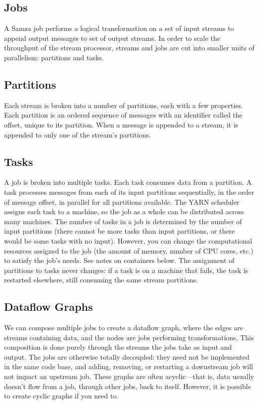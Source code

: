 \documentclass[9pt,twocolumn,twoside]{../../styles/osajnl}
\begin{document}
\subsection{Jobs}
A Samza job performs a logical transformation on a set of input streams to
append output messages to set of output streams. In order to scale the
throughput of the stream processor, streams and jobs are cut into smaller units
of parallelism: partitions and tasks.\cite{www-samza}

\subsection{Partitions}
Each stream is broken into a number of partitions, each with a few properties.
Each partition is an ordered sequence of messages with an identifier called the
offset, unique to its partition. When a message is appended to a stream, it is
appended to only one of the stream’s partitions.\cite{www-samza}

\subsection{Tasks}
A job is broken into multiple tasks. Each task consumes data from a partition. A
task processes messages from each of its input partitions sequentially, in the
order of message offset, in parallel for all partitions available. The YARN
scheduler assigns each task to a machine, so the job as a whole can be
distributed across many machines. The number of tasks in a job is determined by
the number of input partitions (there cannot be more tasks than input
partitions, or there would be some tasks with no input). However, you can change
the computational resources assigned to the job (the amount of memory, number of
CPU cores, etc.) to satisfy the job’s needs. See notes on containers below. The
assignment of partitions to tasks never changes: if a task is on a machine that
fails, the task is restarted elsewhere, still consuming the same stream
partitions.\cite{www-samza}\cite{paper5}

\subsection{Dataflow Graphs}
We can compose multiple jobs to create a dataflow graph, where the edges are
streams containing data, and the nodes are jobs performing transformations. This
composition is done purely through the streams the jobs take as input and
output. The jobs are otherwise totally decoupled: they need not be implemented
in the same code base, and adding, removing, or restarting a downstream job will
not impact an upstream job. These graphs are often acyclic—that is, data usually
doesn’t flow from a job, through other jobs, back to itself. However, it is
possible to create cyclic graphs if you need to.\cite{www-samza}
\end{document}
